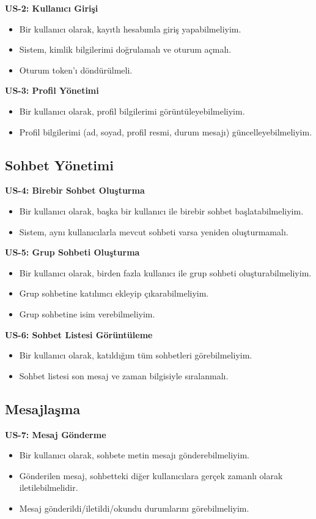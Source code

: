 \textbf{US-2: Kullanıcı Girişi}
\begin{itemize}
    \item Bir kullanıcı olarak, kayıtlı hesabımla giriş yapabilmeliyim.
    \item Sistem, kimlik bilgilerimi doğrulamalı ve oturum açmalı.
    \item Oturum token'ı döndürülmeli.
\end{itemize}

\textbf{US-3: Profil Yönetimi}
\begin{itemize}
    \item Bir kullanıcı olarak, profil bilgilerimi görüntüleyebilmeliyim.
    \item Profil bilgilerimi (ad, soyad, profil resmi, durum mesajı) güncelleyebilmeliyim.
\end{itemize}

\subsection{Sohbet Yönetimi}
\textbf{US-4: Birebir Sohbet Oluşturma}
\begin{itemize}
    \item Bir kullanıcı olarak, başka bir kullanıcı ile birebir sohbet başlatabilmeliyim.
    \item Sistem, aynı kullanıcılarla mevcut sohbeti varsa yeniden oluşturmamalı.
\end{itemize}

\textbf{US-5: Grup Sohbeti Oluşturma}
\begin{itemize}
    \item Bir kullanıcı olarak, birden fazla kullanıcı ile grup sohbeti oluşturabilmeliyim.
    \item Grup sohbetine katılımcı ekleyip çıkarabilmeliyim.
    \item Grup sohbetine isim verebilmeliyim.
\end{itemize}

\textbf{US-6: Sohbet Listesi Görüntüleme}
\begin{itemize}
    \item Bir kullanıcı olarak, katıldığım tüm sohbetleri görebilmeliyim.
    \item Sohbet listesi son mesaj ve zaman bilgisiyle sıralanmalı.
\end{itemize}

\subsection{Mesajlaşma}
\textbf{US-7: Mesaj Gönderme}
\begin{itemize}
    \item Bir kullanıcı olarak, sohbete metin mesajı gönderebilmeliyim.
    \item Gönderilen mesaj, sohbetteki diğer kullanıcılara gerçek zamanlı olarak iletilebilmelidir.
    \item Mesaj gönderildi/iletildi/okundu durumlarını görebilmeliyim.
\end{itemize}

